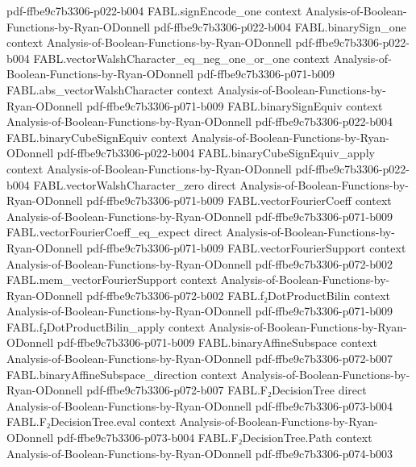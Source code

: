 \begin{theorem}
  {pdf-ffbe9c7b3306-p022-b004}
\proofstep
  {FABL.signEncode_one}
  {context}
  {Analysis-of-Boolean-Functions-by-Ryan-ODonnell}
  {pdf-ffbe9c7b3306-p022-b004}
\proofstep
  {FABL.binarySign_one}
  {context}
  {Analysis-of-Boolean-Functions-by-Ryan-ODonnell}
  {pdf-ffbe9c7b3306-p022-b004}
\proofstep
  {FABL.vectorWalshCharacter_eq_neg_one_or_one}
  {context}
  {Analysis-of-Boolean-Functions-by-Ryan-ODonnell}
  {pdf-ffbe9c7b3306-p071-b009}
\proofstep
  {FABL.abs_vectorWalshCharacter}
  {context}
  {Analysis-of-Boolean-Functions-by-Ryan-ODonnell}
  {pdf-ffbe9c7b3306-p071-b009}
\proofstep
  {FABL.binarySignEquiv}
  {context}
  {Analysis-of-Boolean-Functions-by-Ryan-ODonnell}
  {pdf-ffbe9c7b3306-p022-b004}
\proofstep
  {FABL.binaryCubeSignEquiv}
  {context}
  {Analysis-of-Boolean-Functions-by-Ryan-ODonnell}
  {pdf-ffbe9c7b3306-p022-b004}
\proofstep
  {FABL.binaryCubeSignEquiv_apply}
  {context}
  {Analysis-of-Boolean-Functions-by-Ryan-ODonnell}
  {pdf-ffbe9c7b3306-p022-b004}
\proofstep
  {FABL.vectorWalshCharacter_zero}
  {direct}
  {Analysis-of-Boolean-Functions-by-Ryan-ODonnell}
  {pdf-ffbe9c7b3306-p071-b009}
\proofstep
  {FABL.vectorFourierCoeff}
  {context}
  {Analysis-of-Boolean-Functions-by-Ryan-ODonnell}
  {pdf-ffbe9c7b3306-p071-b009}
\proofstep
  {FABL.vectorFourierCoeff_eq_expect}
  {direct}
  {Analysis-of-Boolean-Functions-by-Ryan-ODonnell}
  {pdf-ffbe9c7b3306-p071-b009}
\proofstep
  {FABL.vectorFourierSupport}
  {context}
  {Analysis-of-Boolean-Functions-by-Ryan-ODonnell}
  {pdf-ffbe9c7b3306-p072-b002}
\proofstep
  {FABL.mem_vectorFourierSupport}
  {context}
  {Analysis-of-Boolean-Functions-by-Ryan-ODonnell}
  {pdf-ffbe9c7b3306-p072-b002}
\proofstep
  {FABL.f₂DotProductBilin}
  {context}
  {Analysis-of-Boolean-Functions-by-Ryan-ODonnell}
  {pdf-ffbe9c7b3306-p071-b009}
\proofstep
  {FABL.f₂DotProductBilin_apply}
  {context}
  {Analysis-of-Boolean-Functions-by-Ryan-ODonnell}
  {pdf-ffbe9c7b3306-p071-b009}
\proofstep
  {FABL.binaryAffineSubspace}
  {context}
  {Analysis-of-Boolean-Functions-by-Ryan-ODonnell}
  {pdf-ffbe9c7b3306-p072-b007}
\proofstep
  {FABL.binaryAffineSubspace_direction}
  {context}
  {Analysis-of-Boolean-Functions-by-Ryan-ODonnell}
  {pdf-ffbe9c7b3306-p072-b007}
\proofstep
  {FABL.F₂DecisionTree}
  {direct}
  {Analysis-of-Boolean-Functions-by-Ryan-ODonnell}
  {pdf-ffbe9c7b3306-p073-b004}
\proofstep
  {FABL.F₂DecisionTree.eval}
  {context}
  {Analysis-of-Boolean-Functions-by-Ryan-ODonnell}
  {pdf-ffbe9c7b3306-p073-b004}
\proofstep
  {FABL.F₂DecisionTree.Path}
  {context}
  {Analysis-of-Boolean-Functions-by-Ryan-ODonnell}
  {pdf-ffbe9c7b3306-p074-b003}

\end{theorem}
